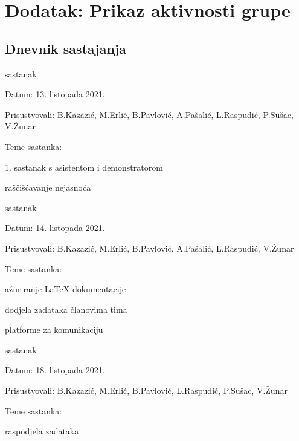 \chapter*{Dodatak: Prikaz aktivnosti grupe}
		
		\section*{Dnevnik sastajanja}
		
		\begin{packed_enum}
			\item  sastanak
			
			\item[] \begin{packed_item}
				\item Datum: 13. listopada 2021.
				\item Prisustvovali: B.Kazazić, M.Erlić, B.Pavlović, A.Pašalić, L.Raspudić, P.Sušac, V.Žunar
				\item Teme sastanka:
				\begin{packed_item}
					\item 1. sastanak s asistentom i demonstratorom
					\item raščišćavanje nejasnoća
				\end{packed_item}
			\end{packed_item}
			
			\item  sastanak
			\item[] \begin{packed_item}
				\item Datum: 14. listopada 2021.
				\item Prisustvovali: B.Kazazić, M.Erlić, B.Pavlović, A.Pašalić, L.Raspudić, V.Žunar
				\item Teme sastanka:
				\begin{packed_item}
					\item ažuriranje LaTeX dokumentacije
					\item dodjela zadataka članovima tima
					\item platforme za komunikaciju
				\end{packed_item}
			\end{packed_item}
			
			\item  sastanak
			\item[] \begin{packed_item}
				\item Datum: 18. listopada 2021.
				\item Prisustvovali: B.Kazazić, M.Erlić, B.Pavlović, L.Raspudić, P.Sušac, V.Žunar
				\item Teme sastanka:
				\begin{packed_item}
					\item raspodjela zadataka
				\end{packed_item}
			\end{packed_item}
			

\end{packed_enum}
